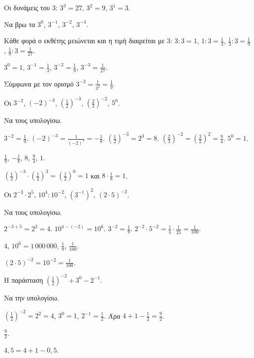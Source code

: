 
\tixero Οι δυνάμεις του $3$: $3^3=27$, $3^2=9$, $3^1=3$.\par
\tithelo Να βρω τα $3^0$, $3^{-1}$, $3^{-2}$, $3^{-3}$.\par
\possindeo Κάθε φορά ο εκθέτης μειώνεται και η τιμή διαιρείται με $3$: $3:3=1$, $1:3=\frac{1}{3}$, $\frac{1}{3}:3=\frac{1}{9}$, $\frac{1}{9}:3=\frac{1}{27}$.\par
\apantisi $3^0=1$, $3^{-1}=\frac{1}{3}$, $3^{-2}=\frac{1}{9}$, $3^{-3}=\frac{1}{27}$.\par
\elegxos Σύμφωνα με τον ορισμό $3^{-2}=\frac{1}{3^2}=\frac{1}{9}$.

\tixero Οι $3^{-2}$, $(-2)^{-3}$, $\left(\frac{1}{2}\right)^{-3}$, $\left(\frac{2}{3}\right)^{-2}$, $5^0$.\par
\tithelo Να τους υπολογίσω.\par
\possindeo $3^{-2}=\frac{1}{9}$. $(-2)^{-3}=\frac{1}{(-2)^3}=-\frac{1}{8}$. $\left(\frac{1}{2}\right)^{-3}=2^3=8$. $\left(\frac{2}{3}\right)^{-2}=\left(\frac{3}{2}\right)^2=\frac{9}{4}$. $5^0=1$.\par
\apantisi $\frac{1}{9}$, $-\frac{1}{8}$, $8$, $\frac{9}{4}$, $1$.\par
\elegxos $\left(\frac{1}{2}\right)^{-3}\cdot\left(\frac{1}{2}\right)^{3}=\left(\frac{1}{2}\right)^0=1$ και $8\cdot\frac{1}{8}=1$.

\tixero Οι $2^{-3}\cdot2^5$, $10^4:10^{-2}$, $(3^{-1})^2$, $(2\cdot5)^{-2}$.\par
\tithelo Να τους υπολογίσω.\par
\possindeo $2^{-3+5}=2^2=4$. $10^{4-(-2)}=10^6$. $3^{-2}=\frac{1}{9}$. $2^{-2}\cdot5^{-2}=\frac{1}{4}\cdot\frac{1}{25}=\frac{1}{100}$.\par
\apantisi $4$, $10^6=1\,000\,000$, $\frac{1}{9}$, $\frac{1}{100}$.\par
\elegxos $(2\cdot5)^{-2}=10^{-2}=\frac{1}{100}$.

\tixero Η παράσταση $\left(\frac{1}{2}\right)^{-2}+3^0-2^{-1}$.\par
\tithelo Να την υπολογίσω.\par
\possindeo $\left(\frac{1}{2}\right)^{-2}=2^2=4$, $3^0=1$, $2^{-1}=\frac{1}{2}$. Άρα $4+1-\frac{1}{2}=\frac{9}{2}$.\par
\apantisi $\frac{9}{2}$.\par
\elegxos $4{,}5=4+1-0{,}5$.

